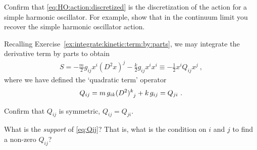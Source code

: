 \documentclass[12pt, oneside]{report}    %
\begin{document}
\begin{exercise}
Confirm that \eqref{eq:HO:action:discretized} is the discretization of the action for a simple harmonic oscillator. For example, show that in the continuum limit you recover the simple harmonic oscillator action. 
\end{exercise}
Recalling Exercise~\ref{ex:integrate:kinetic:term:by:parts}, we may integrate the derivative term by parts to obtain
\begin{align}
    S = 
    -
    \frac{m}{2} g_{ij}x^i (D^2x)^j 
    - \frac{k}{2} g_{ij} x^ix^i
    \equiv
    -\frac{1}{2}x^i Q_{ij} x^j
    \ ,
    \label{eq:HO:action:discretized:integrated}
\end{align}
where we have defined the `quadratic term' operator
\begin{align}
    Q_{ij} = 
    m\, g_{ik}(D^2)\aij{k}{j} 
    + 
    k\, g_{ij} 
    = Q_{ji} \ .
    \label{eq:Qij}
\end{align}
\begin{exercise}
Confirm that $Q_{ij}$ is symmetric, $Q_{ij} = Q_{ji}$. 
\end{exercise}
\begin{exercise}
What is the \emph{support} of \eqref{eq:Qij}? That is, what is the condition on $i$ and $j$ to find a non-zero $Q_{ij}$?
\end{exercise}
\end{document}
